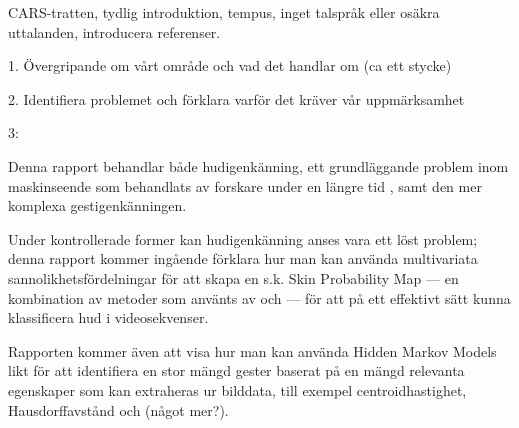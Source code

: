 \documentclass[../rapport_MVEX01-11-05]{subfiles}
\begin{document}
CARS-tratten, tydlig introduktion, tempus, inget talspråk eller osäkra
uttalanden, introducera referenser.

1. Övergripande om vårt område och vad det handlar om (ca ett stycke)

2. Identifiera problemet och förklara varför det kräver vår uppmärksamhet

3:

Denna rapport behandlar både hudigenkänning, ett grundläggande problem
inom maskinseende som behandlats av forskare under en längre tid
\cite{Kakumanu07}, samt den mer komplexa gestigenkänningen.

Under kontrollerade former kan hudigenkänning anses vara ett löst
problem; denna rapport kommer ingående förklara hur man kan använda
multivariata sannolikhetsfördelningar för att skapa en s.k. Skin
Probability Map --- en kombination av metoder som använts av
 och  --- för att på ett
effektivt sätt kunna klassificera hud i videosekvenser.

Rapporten kommer även att visa hur man kan använda Hidden Markov
Models likt  för att identifiera en stor mängd
gester baserat på en mängd relevanta egenskaper som kan extraheras ur
bilddata, till exempel centroidhastighet, Hausdorffavstånd
\cite{Nielsen04} och (något mer?).
\end{document}
